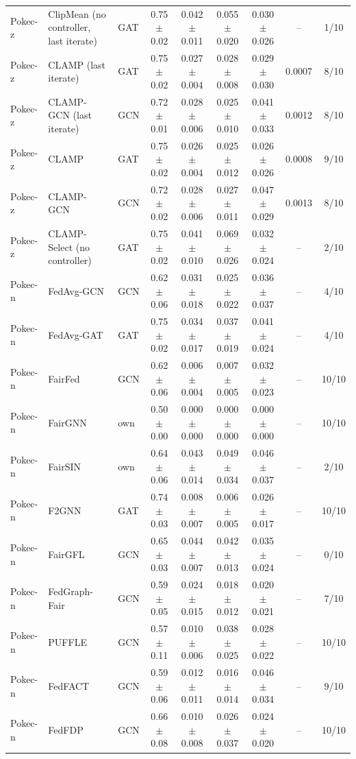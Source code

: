 \begin{longtable}{lp{3.2cm}lcccccc}
Pokec-z & ClipMean (no controller, last iterate) & GAT & 0.75$\pm$0.02 & 0.042$\pm$0.011 & 0.055$\pm$0.020 & 0.030$\pm$0.026 & -- & 1/10 \\
Pokec-z & CLAMP (last iterate) & GAT & 0.75$\pm$0.02 & 0.027$\pm$0.004 & 0.028$\pm$0.008 & 0.029$\pm$0.030 & 0.0007 & 8/10 \\
Pokec-z & CLAMP-GCN (last iterate) & GCN & 0.72$\pm$0.01 & 0.028$\pm$0.006 & 0.025$\pm$0.010 & 0.041$\pm$0.033 & 0.0012 & 8/10 \\
Pokec-z & CLAMP & GAT & 0.75$\pm$0.02 & 0.026$\pm$0.004 & 0.025$\pm$0.012 & 0.026$\pm$0.026 & 0.0008 & 9/10 \\
Pokec-z & CLAMP-GCN & GCN & 0.72$\pm$0.02 & 0.028$\pm$0.006 & 0.027$\pm$0.011 & 0.047$\pm$0.029 & 0.0013 & 8/10 \\
Pokec-z & CLAMP-Select (no controller) & GAT & 0.75$\pm$0.02 & 0.041$\pm$0.010 & 0.069$\pm$0.026 & 0.032$\pm$0.024 & -- & 2/10 \\
Pokec-n & FedAvg-GCN & GCN & 0.62$\pm$0.06 & 0.031$\pm$0.018 & 0.025$\pm$0.022 & 0.036$\pm$0.037 & -- & 4/10 \\
Pokec-n & FedAvg-GAT & GAT & 0.75$\pm$0.02 & 0.034$\pm$0.017 & 0.037$\pm$0.019 & 0.041$\pm$0.024 & -- & 4/10 \\
Pokec-n & FairFed & GCN & 0.62$\pm$0.06 & 0.006$\pm$0.004 & 0.007$\pm$0.005 & 0.032$\pm$0.023 & -- & 10/10 \\
Pokec-n & FairGNN & own & 0.50$\pm$0.00 & 0.000$\pm$0.000 & 0.000$\pm$0.000 & 0.000$\pm$0.000 & -- & 10/10 \\
Pokec-n & FairSIN & own & 0.64$\pm$0.06 & 0.043$\pm$0.014 & 0.049$\pm$0.034 & 0.046$\pm$0.037 & -- & 2/10 \\
Pokec-n & F2GNN & GAT & 0.74$\pm$0.03 & 0.008$\pm$0.007 & 0.006$\pm$0.005 & 0.026$\pm$0.017 & -- & 10/10 \\
Pokec-n & FairGFL & GCN & 0.65$\pm$0.03 & 0.044$\pm$0.007 & 0.042$\pm$0.013 & 0.035$\pm$0.024 & -- & 0/10 \\
Pokec-n & FedGraph-Fair & GCN & 0.59$\pm$0.05 & 0.024$\pm$0.015 & 0.018$\pm$0.012 & 0.020$\pm$0.021 & -- & 7/10 \\
Pokec-n & PUFFLE & GCN & 0.57$\pm$0.11 & 0.010$\pm$0.006 & 0.038$\pm$0.025 & 0.028$\pm$0.022 & -- & 10/10 \\
Pokec-n & FedFACT & GCN & 0.59$\pm$0.06 & 0.012$\pm$0.011 & 0.016$\pm$0.014 & 0.046$\pm$0.034 & -- & 9/10 \\
Pokec-n & FedFDP & GCN & 0.66$\pm$0.08 & 0.010$\pm$0.008 & 0.026$\pm$0.037 & 0.024$\pm$0.020 & -- & 10/10 \\

\end{longtable}
